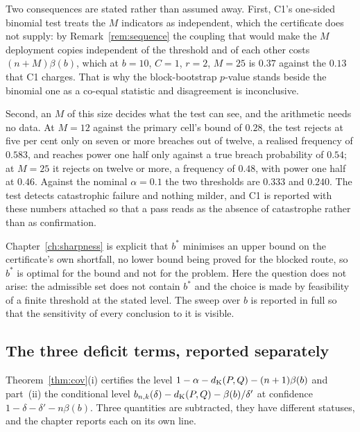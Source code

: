 \documentclass[../../../main.tex]{subfiles}
\begin{document}
Two consequences are stated rather than assumed away. First, C1's one-sided binomial test treats the $M$ indicators as independent, which the certificate does not supply: by Remark~\ref{rem:sequence} the coupling that would make the $M$ deployment copies independent of the threshold and of each other costs $(n+M)\beta(b)$, which at $b=10$, $C=1$, $r=2$, $M=25$ is $0.37$ against the $0.13$ that C1 charges. That is why the block-bootstrap $p$-value stands beside the binomial one as a co-equal statistic and disagreement is inconclusive.

Second, an $M$ of this size decides what the test can see, and the arithmetic needs no data. At $M=12$ against the primary cell's bound of $0.28$, the test rejects at five per cent only on seven or more breaches out of twelve, a realised frequency of $0.583$, and reaches power one half only against a true breach probability of $0.54$; at $M=25$ it rejects on twelve or more, a frequency of $0.48$, with power one half at $0.46$. Against the nominal $\alpha=0.1$ the two thresholds are $0.333$ and $0.240$. The test detects catastrophic failure and nothing milder, and C1 is reported with these numbers attached so that a pass reads as the absence of catastrophe rather than as confirmation.

\begin{remark}\label{rem:usd-b}
Chapter~\ref{ch:sharpness} is explicit that $b^*$ minimises an upper bound on the certificate's own shortfall, no lower bound being proved for the blocked route, so $b^*$ is optimal for the bound and not for the problem. Here the question does not arise: the admissible set does not contain $b^*$ and the choice is made by feasibility of a finite threshold at the stated level. The sweep over $b$ is reported in full so that the sensitivity of every conclusion to it is visible.
\end{remark}

\subsection{The three deficit terms, reported separately}

Theorem~\ref{thm:cov}(i) certifies the level $1-\alpha-d_{\mathrm{K}}(P,Q)-(n+1)\beta(b)$ and part~(ii) the conditional level $b_{n,k}(\delta)-d_{\mathrm{K}}(P,Q)-\beta(b)/\delta'$ at confidence $1-\delta-\delta'-n\beta(b)$. Three quantities are subtracted, they have different statuses, and the chapter reports each on its own line.
\end{document}
